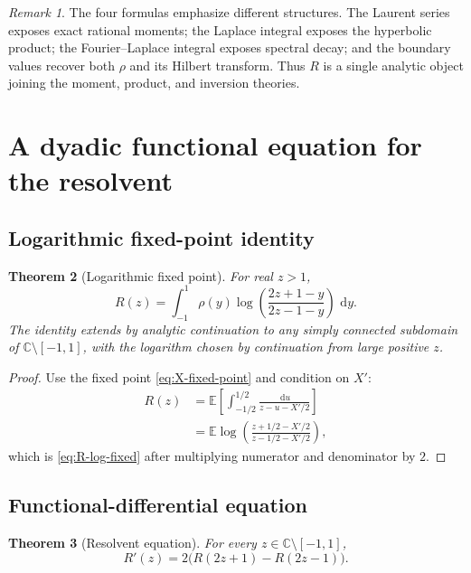 \documentclass[11pt]{article}
\newtheorem{theorem}{Theorem}[section]
\theoremstyle{definition}
\theoremstyle{remark}
\newtheorem{remark}[theorem]{Remark}
\newcommand{\C}{\mathbb C}
\newcommand{\E}{\mathbb E}
\newcommand{\dd}{\,\mathrm d}
\begin{document}
\begin{remark}
The four formulas emphasize different structures.  The Laurent series exposes exact
rational moments; the Laplace integral exposes the hyperbolic product; the Fourier--Laplace
integral exposes spectral decay; and the boundary values recover both \(\rho\) and its
Hilbert transform.  Thus \(R\) is a single analytic object joining the moment, product,
and inversion theories.
\end{remark}

\section{A dyadic functional equation for the resolvent}

\subsection{Logarithmic fixed-point identity}

\begin{theorem}[Logarithmic fixed point]\label{thm:R-log-fixed}
For real \(z>1\),
\begin{equation}
 R(z)=\int_{-1}^{1}\rho(y)
 \log\!\left(\frac{2z+1-y}{2z-1-y}\right)\,\dd y.           \label{eq:R-log-fixed}
\end{equation}
The identity extends by analytic continuation to any simply connected subdomain of
\(\C\setminus[-1,1]\), with the logarithm chosen by continuation from large positive
\(z\).
\end{theorem}

\begin{proof}
Use the fixed point \eqref{eq:X-fixed-point} and condition on \(X'\):
\begin{align*}
 R(z)
 &=\E\left[\int_{-1/2}^{1/2}
   \frac{\dd u}{z-u-X'/2}\right]\\
 &=\E\log\!\left(\frac{z+1/2-X'/2}{z-1/2-X'/2}\right),
\end{align*}
which is \eqref{eq:R-log-fixed} after multiplying numerator and denominator by \(2\).
\end{proof}

\subsection{Functional-differential equation}

\begin{theorem}[Resolvent equation]\label{thm:R-dde}
For every \(z\in\C\setminus[-1,1]\),
\begin{equation}
 \boxed{R'(z)=2\bigl(R(2z+1)-R(2z-1)\bigr).}                \label{eq:R-dde}
\end{equation}
\end{theorem}
\end{document}
